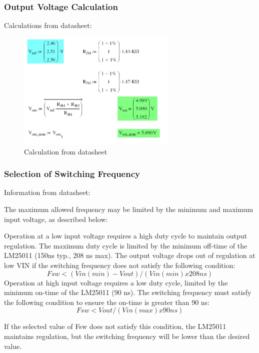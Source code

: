 \subsubsection{Output Voltage Calculation}
Calculations from datasheet:
\begin{figure}[htbp]
\begin{center}
\includegraphics[width=3in]{includes/DatasheetCalc}
\caption{Calculation from datasheet}
\label{fig:1}
\end{center}
\end{figure}


\subsubsection{Selection of Switching Frequency}
Information from datasheet:

The maximum allowed frequency may be limited by the minimum and maximum input voltage, as described below:
\begin{outline}[enumerate]
\1 Operation at a low input voltage requires a high duty cycle to maintain output regulation. The maximum duty cycle is limited by the minimum off-time of the LM25011 (150ns typ., 208 ns max).  The output voltage drops out of regulation at low VIN if  the switching frequency does not satisfy the following condition:
\begin{equation}
Fsw < (Vin(min)-Vout) / ( Vin(min) x 208ns)
\end{equation}
\1 Operation at high input voltage requires a low duty cycle, limited by the minimum on-time of the LM25011 (90 ns). The switching frequency must satisfy the following condition to ensure the on-time is greater than 90 ns:
\begin{equation}
Fsw < Vout / (Vin(max) x 90ns)
\end{equation}
\end{outline}

If the selected value of Fsw does not satisfy this condition, the LM25011 maintains regulation, but the switching frequency will be lower than the desired value.

